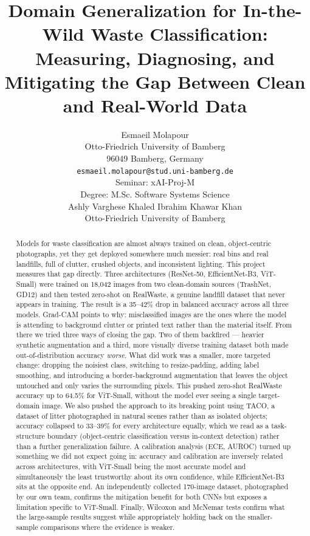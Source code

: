 \documentclass[a4paper]{article}
\title{Domain Generalization for In-the-Wild Waste Classification: \\
Measuring, Diagnosing, and Mitigating the Gap Between Clean and Real-World Data}
\author{%
  Esmaeil Molapour \\
  Otto-Friedrich University of Bamberg\\
  96049 Bamberg, Germany\\
  \texttt{esmaeil.molapour@stud.uni-bamberg.de} \\[0.3cm]
  Seminar: xAI-Proj-M \\
  Degree: M.Sc. Software Systems Science \\
  \AND
  Ashly Varghese \quad Khaled Ibrahim \quad Khawar Khan \\
  Otto-Friedrich University of Bamberg
}
\begin{document}
\maketitle

\begin{abstract}
Models for waste classification are almost always trained on clean, object-centric photographs, yet they get deployed somewhere much messier: real bins and real landfills, full of clutter, crushed objects, and inconsistent lighting. This project measures that gap directly. Three architectures (ResNet-50, EfficientNet-B3, ViT-Small) were trained on 18{,}042 images from two clean-domain sources (TrashNet, GD12) and then tested zero-shot on RealWaste, a genuine landfill dataset that never appears in training. The result is a 35--42\% drop in balanced accuracy across all three models. Grad-CAM points to why: misclassified images are the ones where the model is attending to background clutter or printed text rather than the material itself. From there we tried three ways of closing the gap. Two of them backfired --- heavier synthetic augmentation and a third, more visually diverse training dataset both made out-of-distribution accuracy \emph{worse}. What did work was a smaller, more targeted change: dropping the noisiest class, switching to resize-padding, adding label smoothing, and introducing a border-background augmentation that leaves the object untouched and only varies the surrounding pixels. This pushed zero-shot RealWaste accuracy up to 64.5\% for ViT-Small, without the model ever seeing a single target-domain image. We also pushed the approach to its breaking point using TACO, a dataset of litter photographed in natural scenes rather than as isolated objects; accuracy collapsed to 33--39\% for every architecture equally, which we read as a task-structure boundary (object-centric classification versus in-context detection) rather than a further generalization failure. A calibration analysis (ECE, AUROC) turned up something we did not expect going in: accuracy and calibration are inversely related across architectures, with ViT-Small being the most accurate model and simultaneously the least trustworthy about its own confidence, while EfficientNet-B3 sits at the opposite end. An independently collected 170-image dataset, photographed by our own team, confirms the mitigation benefit for both CNNs but exposes a limitation specific to ViT-Small. Finally, Wilcoxon and McNemar tests confirm what the large-sample results suggest while appropriately holding back on the smaller-sample comparisons where the evidence is weaker.
\end{abstract}
\end{document}
